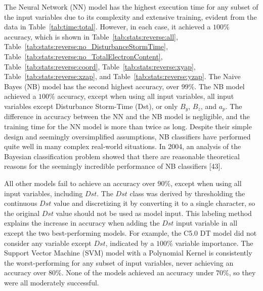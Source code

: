 \documentclass[sn-mathphys-num]{sn-jnl}%
\begin{document}
The Neural Network (NN) model has the highest execution time for any subset of the input variables due to its complexity and extensive training, evident from the data in Table~\ref{tab:time:total}. However, in each case, it achieved a $100\%$ accuracy, which is shown in Table~\ref{tab:stats:reverse:all}, Table~\ref{tab:stats:reverse:no_DisturbanceStormTime}, Table~\ref{tab:stats:reverse:no_TotalElectronContent}, Table~\ref{tab:stats:reverse:coord}, Table~\ref{tab:stats:reverse:xyap}, Table~\ref{tab:stats:reverse:xzap}, and Table~\ref{tab:stats:reverse:yzap}. The Naive Bayes (NB) model has the second highest accuracy, over $99\%$. The NB model achieved a $100\%$ accuracy, except when using all input variables, all input variables except Disturbance Storm-Time (Dst), or only $B_{y}$, $B_{z}$, and $a_{p}$. The difference in accuracy between the NN and the NB model is negligible, and the training time for the NN model is more than twice as long. Despite their simple design and seemingly oversimplified assumptions, NB classifiers have performed quite well in many complex real-world situations. In 2004, an analysis of the Bayesian classification problem showed that there are reasonable theoretical reasons for the seemingly incredible performance of NB classifiers [43].

All other models fail to achieve an accuracy over $90\%$, except when using all input variables, including $Dst$. The $Dst$ class was derived by thresholding the continuous $Dst$ value and discretizing it by converting it to a single character, so the original $Dst$ value should not be used as model input. This labeling method explains the increase in accuracy when adding the $Dst$ input variable in all except the two best-performing models. For example, the C5.0 DT model did not consider any variable except $Dst$, indicated by a $100\%$ variable importance. The Support Vector Machine (SVM) model with a Polynomial Kernel is consistently the worst-performing for any subset of input variables, never achieving an accuracy over $80\%$. None of the models achieved an accuracy under $70\%$, so they were all moderately successful.
\end{document}
